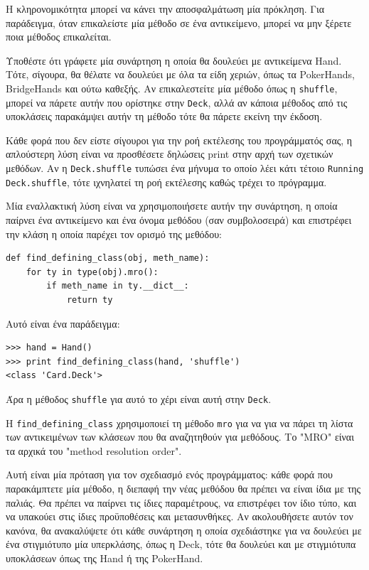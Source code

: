 \documentclass[10pt]{book}
\begin{document}
Η κληρονομικότητα μπορεί να κάνει την αποσφαλμάτωση μία πρόκληση. Για παράδειγμα, όταν 
επικαλείστε μία μέθοδο σε ένα αντικείμενο, μπορεί να μην ξέρετε ποια μέθοδος επικαλείται.

Υποθέστε ότι γράφετε μία συνάρτηση η οποία θα δουλεύει με αντικείμενα Hand.
Τότε, σίγουρα, θα θέλατε να δουλεύει με όλα τα είδη χεριών, όπως τα PokerHands, BridgeHands
και ούτω καθεξής.  Αν επικαλεστείτε μία μέθοδο όπως η {\tt shuffle}, μπορεί να πάρετε αυτήν
που ορίστηκε στην {\tt Deck}, αλλά αν κάποια μέθοδος από τις υποκλάσεις παρακάμψει αυτήν τη
μέθοδο τότε θα πάρετε εκείνη την έκδοση.

Κάθε φορά που δεν είστε σίγουροι για την ροή εκτέλεσης του προγράμματός σας,
η απλούστερη λύση είναι να προσθέσετε δηλώσεις print στην αρχή των σχετικών 
μεθόδων. Αν η {\tt Deck.shuffle} τυπώσει ένα μήνυμα το οποίο λέει κάτι
τέτοιο {\tt Running Deck.shuffle}, τότε ιχνηλατεί τη ροή εκτέλεσης καθώς 
τρέχει το πρόγραμμα.

Μία εναλλακτική λύση είναι να χρησιμοποιήσετε αυτήν την συνάρτηση, η οποία παίρνει 
ένα αντικείμενο και ένα όνομα μεθόδου (σαν συμβολοσειρά) και επιστρέφει την κλάση η 
οποία παρέχει τον ορισμό της μεθόδου:

\begin{verbatim}
def find_defining_class(obj, meth_name):
    for ty in type(obj).mro():
        if meth_name in ty.__dict__:
            return ty
\end{verbatim}
%
Αυτό είναι ένα παράδειγμα:

\begin{verbatim}
>>> hand = Hand()
>>> print find_defining_class(hand, 'shuffle')
<class 'Card.Deck'>
\end{verbatim}
%
Άρα η μέθοδος {\tt shuffle} για αυτό το χέρι είναι αυτή στην {\tt Deck}.

Η \verb"find_defining_class" χρησιμοποιεί τη μέθοδο {\tt mro} για να
για να πάρει τη λίστα των αντικειμένων των κλάσεων που θα αναζητηθούν για μεθόδους.  
Το "MRO" είναι τα αρχικά του "method resolution order".

Αυτή είναι μία πρόταση για τον σχεδιασμό ενός προγράμματος: κάθε φορά που παρακάμπτετε μία 
μέθοδο, η διεπαφή την νέας μεθόδου θα πρέπει να είναι ίδια με της παλιάς.  Θα πρέπει να 
παίρνει τις ίδιες παραμέτρους, να επιστρέφει τον ίδιο τύπο, και να υπακούει στις ίδιες 
προϋποθέσεις και μετασυνθήκες.  Αν ακολουθήσετε αυτόν τον κανόνα, θα ανακαλύψετε ότι κάθε 
συνάρτηση η οποία σχεδιάστηκε για να δουλεύει με ένα στιγμιότυπο μία υπερκλάσης, όπως η 
Deck, τότε θα δουλεύει και με στιγμιότυπα υποκλάσεων όπως της Hand ή της PokerHand.
\end{document}
